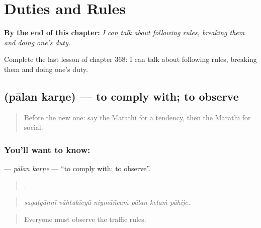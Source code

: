 
\chapter{Duties and Rules}
\label{ch:mr-duties-and-rules}

\begin{chapteropening}
\textbf{By the end of this chapter:} \emph{I can talk about following rules, breaking them and doing one's duty.}

Complete the last lesson of chapter 368: I can talk about following rules, breaking them and doing one's duty.
\end{chapteropening}

\section[\texorpdfstring{\mr{पालन} \mr{करणे} (pālan karṇe)}{पालन करणे (pālan karṇe)}]{  (pālan karṇe) — to comply with; to observe}

\label{lesson:MR-C368-palan-karne}



\begin{quote}
Before the new one: say the Marathi for a tendency, then the Marathi for social.
\end{quote}

\subsection*{You'll want to know:  }
\textbf{ } — \emph{pālan karṇe} — \textquotedblleft{}to comply with; to observe\textquotedblright{}.

\begin{quote}
     .
\end{quote}

\begin{quote}
\emph{sagaḷyānnī vāhtukīcyā niymāñcaṁ pālan kelaṁ pāhije.}
\end{quote}

\begin{quote}
Everyone must observe the traffic rules.
\end{quote}

